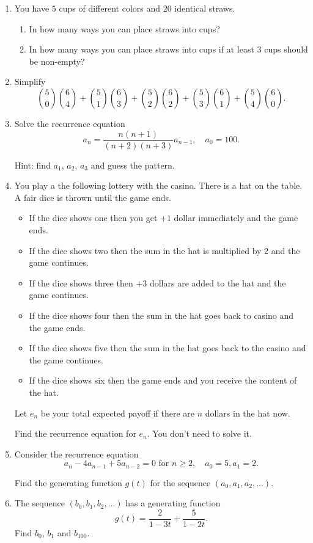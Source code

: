 \documentclass[12pt]{article}
\begin{document}
\begin{enumerate}

    \item You have $5$ cups of different colors and $20$ identical straws. 
    \begin{enumerate}
        \item In how many ways you can place straws into cups?
        \item In how many ways you can place straws into cups if at least $3$ cups should be non-empty?
    \end{enumerate}

    \item Simplify 
    \[
    {5 \choose 0}{6 \choose 4} + {5 \choose 1}{6 \choose 3} + {5 \choose 2}{6 \choose 2} + {5 \choose 3}{6 \choose 1} + {5 \choose 4}{6 \choose 0}.
    \]


    \item Solve the recurrence equation 
    \[
        a_n = \frac{n (n+1)}{(n+2)(n+3)} a_{n-1}, \quad a_0 = 100.
    \]

    Hint: find $a_1$, $a_2$, $a_3$ and guess the pattern. 

    \item You play a the following lottery with the casino. There is a hat on the table. 
A fair dice is thrown until the game ends. 
\begin{itemize}
    \item If the dice shows one then you get $+1$ dollar immediately and the game ends. 
    \item If the dice shows two then the sum in the hat is multiplied by $2$ and the game continues. 
    \item If the dice shows three then $+3$ dollars are added to the hat and the game continues.
    \item If the dice shows four then the sum in the hat goes back to casino and the game ends.
    \item If the dice shows five then the sum in the hat goes back to the casino and the game continues.
    \item If the dice shows six then the game ends and you receive the content of the hat. 
\end{itemize}

Let $e_n$ be your total expected payoff if there are $n$ dollars in the hat now. 

Find the recurrence equation for $e_n$. You don't need to solve it. 

    \item Consider the recurrence equation 
    \[
    a_n - 4a_{n-1} + 5a_{n-2} = 0 \text{ for } n\geq 2, \quad a_0 = 5, a_1 = 2.
    \]

    Find the generating function $g(t)$ for the sequence $(a_0, a_1, a_2, \dots)$. 

    \item The sequence $(b_0, b_1, b_2, \dots)$ has a generating function 
    \[
    g(t) = \frac{2}{1-3t} + \frac{5}{1-2t}.
    \]
    Find $b_0$, $b_1$ and $b_{100}$.

\end{enumerate}
\end{document}
